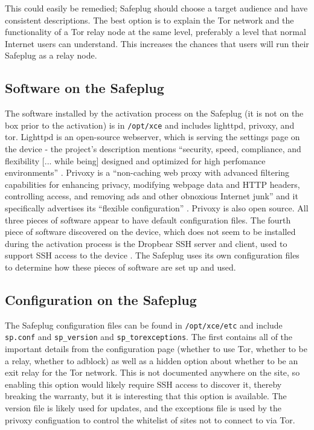 \documentclass[conference]{IEEEtran}
\begin{document}
This could easily be remedied; Safeplug should choose a target audience and have consistent descriptions.  The best option is to explain the Tor network and the functionality of a Tor relay node at the same level, preferably a level that normal Internet users can understand.  This increases the chances that users will run their Safeplug as a relay node.

\subsection{Software on the Safeplug}
The software installed by the activation process on the Safeplug (it is not on the box prior to the activation) is in \verb!/opt/xce! and includes lighttpd, privoxy, and tor.  Lighttpd is an open-source webserver, which is serving the settings page on the device - the project's description mentions ``security, speed, compliance, and flexibility [... while being] designed and optimized for high perfomance environments'' \cite{lighttpd}.  Privoxy is a ``non-caching web proxy with advanced filtering capabilities for enhancing privacy, modifying webpage data and HTTP headers, controlling access, and removing ads and other obnoxious Internet junk'' and it specifically advertises its ``flexible configuration'' \cite{privoxy}.  Privoxy is also open source.  All three pieces of software appear to have default configuration files.  The fourth piece of software discovered on the device, which does not seem to be installed during the activation process is the Dropbear SSH server and client, used to support SSH access to the device \cite{dropbear}.  The Safeplug uses its own configuration files to determine how these pieces of software are set up and used.
    
\subsection{Configuration on the Safeplug}
\label{spconfig}
The Safeplug configuration files can be found in \verb!/opt/xce/etc! and include \verb!sp.conf! and \verb!sp_version! and \verb!sp_torexceptions!.  The first contains all of the important details from the configuration page (whether to use Tor, whether to be a relay, whether to adblock) as well as a hidden option about whether to be an exit relay for the Tor network.  This is not documented anywhere on the site, so enabling this option would likely require SSH access to discover it, thereby breaking the warranty, but it is interesting that this option is available.  The version file is likely used for updates, and the exceptions file is used by the privoxy configuation to control the whitelist of sites not to connect to via Tor.
\end{document}
